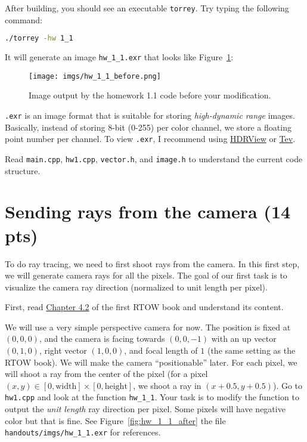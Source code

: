 After building, you should see an executable \lstinline{torrey}. Try typing the following command:
\begin{lstlisting}[language=bash]
  ./torrey -hw 1_1
\end{lstlisting}
It will generate an image \lstinline{hw_1_1.exr} that looks like Figure~\ref{fig:hw_1_1_before}:
\begin{figure}[ht]
    \centering
    \texttt{[image: imgs/hw\_1\_1\_before.png]}
    \caption{Image output by the homework 1.1 code before your modification.}
    \label{fig:hw_1_1_before}
\end{figure}

\lstinline{.exr} is an image format that is suitable for storing \emph{high-dynamic range} images. Basically, instead of storing 8-bit (0-255) per color channel, we store a floating point number per channel. To view \lstinline{.exr}, I recommend using \href{https://github.com/wkjarosz/hdrview}{HDRView} or \href{https://github.com/Tom94/tev}{Tev}.

Read \lstinline{main.cpp}, \lstinline{hw1.cpp}, \lstinline{vector.h}, and \lstinline{image.h} to understand the current code structure.

\section{Sending rays from the camera (14 pts)}
To do ray tracing, we need to first shoot rays from the camera. In this first step, we will generate camera rays for all the pixels. The goal of our first task is to visualize the camera ray direction (normalized to unit length per pixel).

First, read \href{https://raytracing.github.io/books/RayTracingInOneWeekend.html\#rays,asimplecamera,andbackground}{Chapter 4.2} of the first RTOW book and understand its content.

We will use a very simple perspective camera for now. The position is fixed at $(0, 0, 0)$, and the camera is facing towards $(0, 0, -1)$ with an up vector $(0, 1, 0)$, right vector $(1, 0, 0)$, and focal length of $1$ (the same setting as the RTOW book). We will make the camera ``positionable'' later. For each pixel, we will shoot a ray from the center of the pixel (for a pixel $(x, y) \in [0, \text{width}] \times [0, \text{height}]$, we shoot a ray in $(x + 0.5, y + 0.5)$). Go to \lstinline{hw1.cpp} and look at the function \lstinline{hw_1_1}. Your task is to modify the function to output the \emph{unit length} ray direction per pixel. Some pixels will have negative color but that is fine. See Figure~\ref{fig:hw_1_1_after} the file \lstinline{handouts/imgs/hw_1_1.exr} for references.


